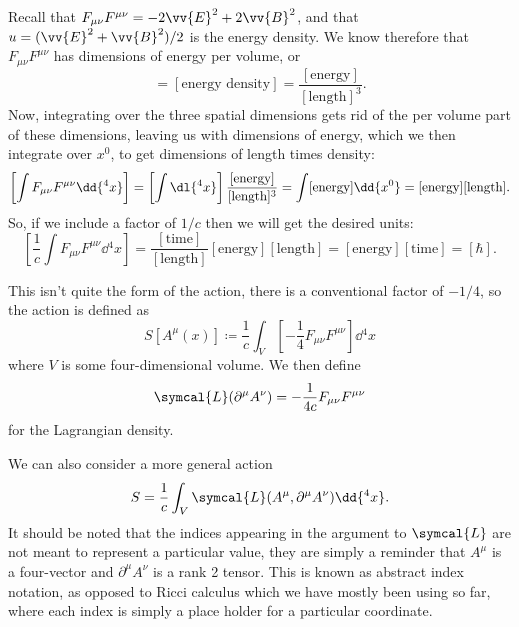 \documentclass[fleqn]{NotesClass}
\newcommand*{\lagrangianDensity}{\symcal{L}}
\begin{document}
    Recall that \(F_{\mu\nu}F^{\mu\nu} = -2\vv{E}^2 + 2\vv{B}^2\), and that \(u = (\vv{E}^2 + \vv{B}^2)/2\) is the energy density.
    We know therefore that \(F_{\mu\nu}F^{\mu\nu}\) has dimensions of energy per volume, or
    \begin{equation}
        [F_{\mu\nu}F^{\mu\nu}] = [\text{energy density}] = \frac{[\text{energy}]}{[\text{length}]^3}.
    \end{equation}
    Now, integrating over the three spatial dimensions gets rid of the per volume part of these dimensions, leaving us with dimensions of energy, which we then integrate over \(x^0\), to get dimensions of length times density:
    \begin{equation*}
        \left[ \int F_{\mu\nu}F^{\mu\nu} \dd{^4x} \right] = \left[ \int \dl{^4x} \right] \frac{[\text{energy}]}{[\text{length}]^3} = \int [\text{energy}] \dd{x^0} = [\text{energy}][\text{length}].
    \end{equation*}
    So, if we include a factor of \(1/c\) then we will get the desired units:
    \begin{equation*}
        \left[ \frac{1}{c} \int F_{\mu\nu}F^{\mu\nu} \dd{^4x} \right] = \frac{[\text{time}]}{[\text{length}]} [\text{energy}][\text{length}] = [\text{energy}][\text{time}] = [\hbar].
    \end{equation*}
    
    This isn't quite the form of the action, there is a conventional factor of \(-1/4\), so the action is defined as
    \begin{equation}
        S[A^\mu(x)] \coloneqq \frac{1}{c}\int_V \left[ -\frac{1}{4}F_{\mu\nu}F^{\mu\nu} \right] \dd{^4x}
    \end{equation}
    where \(V\) is some four-dimensional volume.
    We then define
    \begin{equation}
        \lagrangianDensity(\partial^\mu A^\nu) = -\frac{1}{4c} F_{\mu\nu}F^{\mu\nu}
    \end{equation}
    for the Lagrangian density.
    
    We can also consider a more general action
    \begin{equation}
        S = \frac{1}{c} \int_V \lagrangianDensity(A^\mu, \partial^\mu A^\nu) \dd{^4x}.
    \end{equation}
    It should be noted that the indices appearing in the argument to \(\lagrangianDensity\) are not meant to represent a particular value, they are simply a reminder that \(A^\mu\) is a four-vector and \(\partial^\mu A^\nu\) is a rank 2 tensor.
    This is known as abstract index notation, as opposed to Ricci calculus which we have mostly been using so far, where each index is simply a place holder for a particular coordinate.
    
\end{document}
